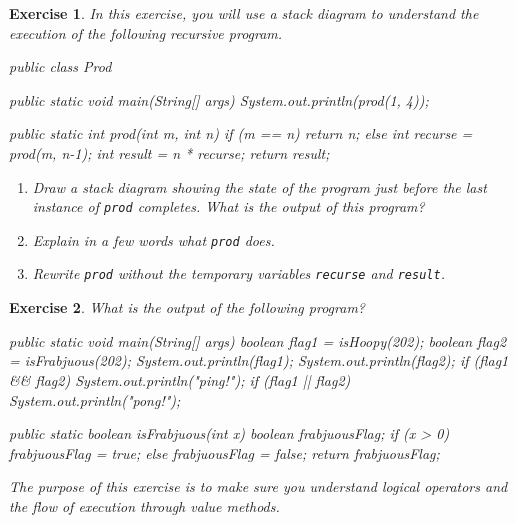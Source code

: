 \documentclass[12pt]{book}
\theoremstyle{exercise}
\newtheorem{exercise}{Exercise}[chapter]
\newcommand{\java}[1]{\verb"#1"}
\newcommand{\java}[1]{\lstinline{#1}} %
\begin{document}
\begin{exercise}

In this exercise, you will use a stack diagram to understand the execution of the following recursive program.

\begin{code}
public class Prod {

    public static void main(String[] args) {
        System.out.println(prod(1, 4));
    }

    public static int prod(int m, int n) {
        if (m == n) {
            return n;
        } else {
            int recurse = prod(m, n-1);
            int result = n * recurse;
            return result;
        }
    }
}
\end{code}

\begin{enumerate}

\item Draw a stack diagram showing the state of the program just before the last instance of \java{prod} completes.
What is the output of this program?

\item Explain in a few words what \java{prod} does.

\item Rewrite \java{prod} without the temporary variables \java{recurse} and \java{result}.

\end{enumerate}

\end{exercise}


\begin{exercise}

What is the output of the following program?

\begin{code}
    public static void main(String[] args) {
        boolean flag1 = isHoopy(202);
        boolean flag2 = isFrabjuous(202);
        System.out.println(flag1);
        System.out.println(flag2);
        if (flag1 && flag2) {
            System.out.println("ping!");
        }
        if (flag1 || flag2) {
            System.out.println("pong!");
        }
    }
\end{code}


\begin{code}
    public static boolean isFrabjuous(int x) {
        boolean frabjuousFlag;
        if (x > 0) {
            frabjuousFlag = true;
        } else {
            frabjuousFlag = false;
        }
        return frabjuousFlag;
    }
\end{code}

The purpose of this exercise is to make sure you understand logical operators and the flow of execution through value methods.

\end{exercise}
\end{document}
